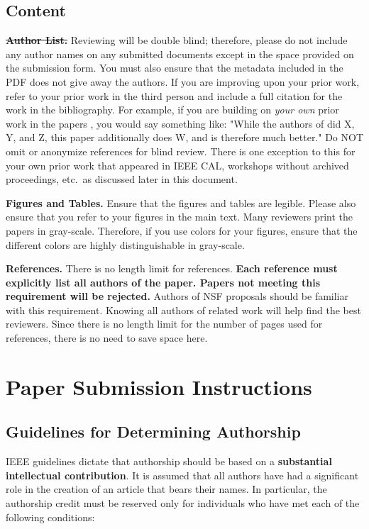 \documentclass{sig-alternate}
\begin{document}
\subsection{Content}

\noindent\textbf{\sout{Author List.}} Reviewing will be double blind;
therefore, please do not include any author names on any submitted
documents except in the space provided on the submission form.  You must
also ensure that the metadata included in the PDF does not give away the
authors. If you are improving upon your prior work, refer to your prior
work in the third person and include a full citation for the work in the
bibliography.  For example, if you are building on {\em your own} prior
work in the papers \cite{nicepaper1,nicepaper2,nicepaper3}, you would say
something like: "While the authors of
\cite{nicepaper1,nicepaper2,nicepaper3} did X, Y, and Z, this paper
additionally does W, and is therefore much better."  Do NOT omit or
anonymize references for blind review.  There is one exception to this for
your own prior work that appeared in IEEE CAL, workshops without archived
proceedings, etc.\, as discussed later in this document.

\noindent\textbf{Figures and Tables.} Ensure that the figures and tables
are legible.  Please also ensure that you refer to your figures in the main
text.  Many reviewers print the papers in gray-scale. Therefore, if you use
colors for your figures, ensure that the different colors are highly
distinguishable in gray-scale.

\noindent\textbf{References.}  There is no length limit for references.
{\bf Each reference must explicitly list all authors of the paper.  Papers
not meeting this requirement will be rejected.} Authors of NSF proposals
should be familiar with this requirement. Knowing all authors of related
work will help find the best reviewers. Since there is no length limit 
for the number of pages used for references, there is no need to save space 
here. 

\section{Paper Submission Instructions}

\subsection{Guidelines for Determining Authorship}


IEEE guidelines dictate that authorship should be based on a {\bf
  substantial intellectual contribution}. It is assumed that all
authors have had a significant role in the creation of an article that
bears their names. In particular, the authorship credit must be
reserved only for individuals who have met each of the following
conditions:
\end{document}
